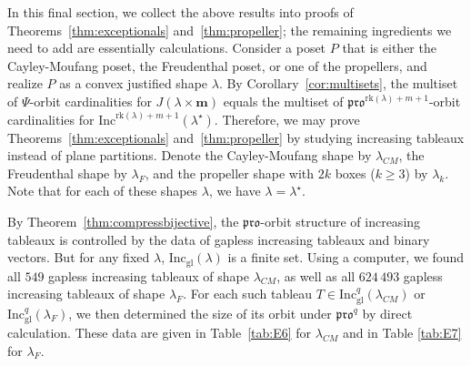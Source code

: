 \documentclass[12pt]{amsart}
\theoremstyle{definition}
\theoremstyle{remark}
\numberwithin{equation}{section}
\newcommand{\inc}{\ensuremath{\mathrm{Inc}}}
\newcommand{\incgl}{\inc_{\mathrm{gl}}}
\newcommand{\pro}{\mathfrak{pro}}
\newcommand{\rank}{\ensuremath{\mathrm{rk}}}
\newcommand{\inflate}{\ensuremath{\mathsf{VecInfl}}}
\newcommand{\tinflate}{\ensuremath{\mathsf{Infl}}}
\newcommand{\compress}{\ensuremath{\mathsf{DeflCon}}}
\begin{document}
In this final section, we collect the above results into proofs of Theorems~\ref{thm:exceptionals} and~\ref{thm:propeller}; the remaining ingredients we need to add are essentially calculations. Consider a poset $P$ that is either the Cayley-Moufang poset, the Freudenthal poset, or one of the propellers, and realize $P$ as a convex justified shape $\lambda$. By Corollary~\ref{cor:multisets},  the multiset of $\Psi$-orbit cardinalities for $J(\lambda \times \mathbf{m})$ equals the multiset of $\pro^{\rank(\lambda)+ m+1}$-orbit cardinalities for $\inc^{ \rank(\lambda)+ m+1}(\lambda^\star)$. Therefore, we may prove Theorems~\ref{thm:exceptionals} and~\ref{thm:propeller} by studying increasing tableaux instead of plane partitions. Denote the Cayley-Moufang shape by $\lambda_{CM}$, the Freudenthal shape by $\lambda_F$, and the propeller shape with $2k$ boxes ($k \geq 3$) by $\lambda_{k}$. Note that for each of these shapes $\lambda$, we have $\lambda = \lambda^\star$.

By Theorem~\ref{thm:compressbijective}, the $\pro$-orbit structure of increasing tableaux is controlled by the data of gapless increasing tableaux and binary vectors. But for any fixed $\lambda$, $\incgl(\lambda)$ is a finite set. Using a computer, we found all $549$ gapless increasing tableaux of shape $\lambda_{CM}$, as well as all $624\, 493$ gapless increasing tableaux of shape $\lambda_F$. For each such tableau $T \in \incgl^q(\lambda_{CM})$ or $\incgl^q(\lambda_F)$, we then determined the size of its orbit under $\pro^q$ by direct calculation. These data are given in Table~\ref{tab:E6} for $\lambda_{CM}$ and in Table \ref{tab:E7} for $\lambda_F$. 
\end{document}
